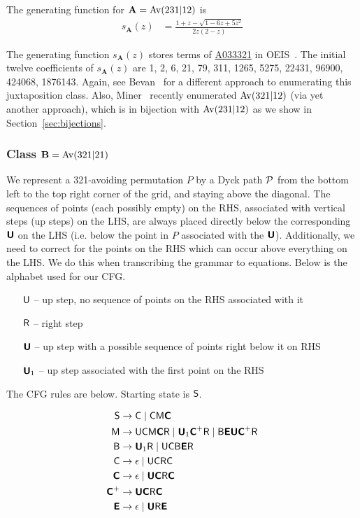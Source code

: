 \begin{theorem}
The generating function for $\mathbf{A} = \Av(231|12)$ is 
\begin{align*}
s_{\mathbf{A}}(z)
&= \frac{1+z-\sqrt{1-6z+5z^2}}{2z(2-z)}
\end{align*}
\end{theorem}

The generating function $s_{\mathbf{A}}(z)$ stores terms of \href{http://oeis.org/A033321}{A033321} in OEIS~\cite{oeis}. The initial twelve coefficients of $s_{\mathbf{A}}(z)$ are 1, 2, 6, 21, 79, 311, 1265, 5275, 22431, 96900, 424068, 1876143. Again, see Bevan~\cite{bevan-new} for a different approach to enumerating this juxtaposition class. Also, Miner~\cite{miner16twobyfour} recently enumerated $\Av(321|12)$ (via yet another approach), which is in bijection with $\Av(231|12)$ as we show in Section~\ref{sec:bijections}.


\subsubsection{Class $\mathbf{B} = \Av(321|21)$}
\label{sec:catalanjuxt_av321av21}
We represent a 321-avoiding permutation $P$ by a Dyck path $\P$ from the bottom left to the top right corner of the grid, and staying above the diagonal. The sequences of points (each possibly empty) on the RHS, associated with vertical steps (up steps) on the LHS, are always placed directly below the corresponding $\bU$ on the LHS (i.e. below the point in $P$ associated with the $\bU$). Additionally, we need to correct for the points on the RHS which can occur above everything on the LHS. We do this when transcribing the grammar to equations. Below is the alphabet used for our CFG.

\begin{enumerate}
\item[$\fU$ --] up step, no sequence of points on the RHS associated with it
\item[$\fR$ --] right step
\item[$\bU$ --] up step with a possible sequence of points right below it on RHS
\item[$\bU_1$ --] up step associated with the first point on the RHS 
\end{enumerate}

\noindent The CFG rules are below. Starting state is $\fS$.

\begin{align*}
\fS &\to \fC \mid \fC\fM\bC\\
\fM &\to \fU\fC\fM\bC\fR \mid \bU_1\bC^+\fR \mid \fB\bE\bU\bC^+\fR\\
\fB &\to \bU_1\fR \mid \fU\fC\fB\bE\fR\\
\fC &\to \epsilon \mid \fU\fC\fR\fC\\
\bC &\to \epsilon \mid \bU\bC\fR\bC\\
\bC^+ &\to \bU\bC\fR\bC\\
\bE &\to \epsilon \mid \bU\fR\bE
\end{align*}


